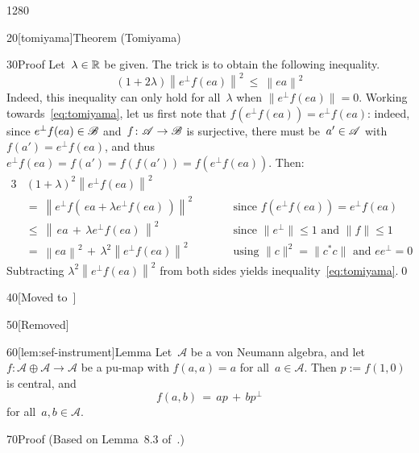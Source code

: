 \begin{parsec}{1280}
\begin{point}{20}[tomiyama]{Theorem (Tomiyama)}
\begin{point}{30}{Proof}
Let~$\lambda \in \mathbb{R}$ be given.
The trick is to obtain the following inequality.
\begin{equation}
\label{eq:tomiyama}
(1+2\lambda) \left\|e^\perp f(ea)\right\|^2 
\ \leq\  \left\|ea\right\|^2
\end{equation}
Indeed, this inequality can only hold for all~$\lambda$
when $\|e^\perp f(ea)\|=0$.
Working towards~\eqref{eq:tomiyama},
let us first note that $f(e^\perp f(ea))=e^\perp f(ea)$:
indeed, since  $e^\perp f(ea)\in \mathscr{B}$
and~$f\colon \mathscr{A}\to\mathscr{B}$ is surjective,
    there must be~$a'\in\mathscr{A}$ with~$f(a')=e^\perp f(ea)$,
    and thus  $e^\perp f(ea)=f(a')=f(f(a'))=f(e^\perp f(ea))$.
Then:
\begin{alignat*}{3}
    &(1+\lambda)^2 \left\|e^\perp f(ea)\right\|^2\\
    &= \ \left\|e^\perp f(\,ea + \lambda e^\perp f(ea)\,)\right\|^2
    \qquad && \text{since }f(e^\perp f(ea))=e^\perp f(ea) \\
    &\leq \ \left\|\,ea\,+\,\lambda e^\perp f(ea)\,\right\|^2\qquad
    &&\text{since }\|e^\perp\|\leq 1\text{ and }\|f\|\leq 1 \\
    &=\ \left\|ea\right\|^2\,+\,\lambda^2 \left\|e^\perp f(ea)\right\|^2
    \qquad&&\text{using $\|c\|^2=\|c^*c\|$ and $ee^\perp=0$}
\end{alignat*}
Subtracting $\lambda^2 \left\|e^\perp f(ea)\right\|^2$ from both
sides yields inequality~\eqref{eq:tomiyama}.\qed
\end{point}
\end{point}
\begin{point}{40}{[Moved to~]}%
    \begin{point}{50}{[Removed]}%
\end{point}
\end{point}
\begin{point}{60}[lem:sef-instrument]{Lemma}%
Let~$\mathscr{A}$ be a von Neumann algebra,
and let~$f\colon \mathscr{A}\oplus\mathscr{A}\to \mathscr{A}$
be a pu-map 
with $f(a,a)=a$ for all~$a\in \mathscr{A}$.
Then $p:=f(1,0)$ is central,
and
\begin{equation*}
	f(a,b) \,=\, ap\,+\, bp^\perp
\end{equation*}
for all~$a,b\in\mathscr{A}$.
\begin{point}{70}{Proof}%
(Based on Lemma~8.3 of~\cite{newdirections}.)


\end{point}
\end{point}
\end{parsec}
